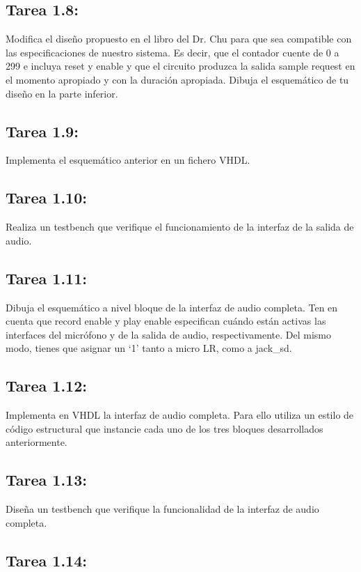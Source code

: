 \documentclass{article}
\begin{document}
\subsection{Tarea 1.8:}
Modifica el diseño propuesto en el libro del Dr. Chu para que sea compatible con las especificaciones de nuestro sistema. Es decir, que el contador cuente de 0 a 299 e incluya reset y enable y que el circuito produzca la salida sample request en el momento apropiado y con la duración apropiada. Dibuja el esquemático de tu diseño en la parte inferior.

\subsection{Tarea 1.9:}
Implementa el esquemático anterior en un fichero VHDL.

\subsection{Tarea 1.10:}
Realiza un testbench que verifique el funcionamiento de la interfaz de la salida de audio.

\subsection{Tarea 1.11:}
Dibuja el esquemático a nivel bloque de la interfaz de audio completa. Ten en cuenta que record enable y play enable especifican cuándo están activas las interfaces del micrófono y de la salida de audio, respectivamente. Del mismo modo, tienes que asignar un `1' tanto a micro LR, como a jack{\_}sd.

\subsection{Tarea 1.12:}
Implementa en VHDL la interfaz de audio completa. Para ello utiliza un estilo de código estructural que instancie cada uno de los tres bloques desarrollados anteriormente.

\subsection{Tarea 1.13:}
Diseña un testbench que verifique la funcionalidad de la interfaz de audio completa.

\subsection{Tarea 1.14:}
\end{document}
